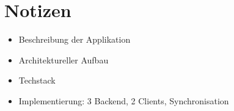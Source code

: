 \chapter{Notizen}
\begin{itemize}
    \item Beschreibung der Applikation
    \item Architektureller Aufbau
    \item Techstack
    \item Implementierung: 3 Backend, 2 Clients, Synchronisation
\end{itemize}
